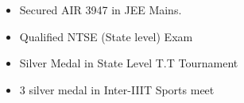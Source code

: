 \documentclass[10pt,a4paper,ragged2e,withhyper]{altacv}
\begin{document}
\begin{paracol}{2}



\begin{itemize}
    \item Secured AIR 3947 in JEE Mains.
    \item Qualified NTSE (State level) Exam
    \item Silver Medal in State Level T.T Tournament
    \item 3 silver medal in Inter-IIIT Sports meet
\end{itemize}


















\end{paracol}
\end{document}

